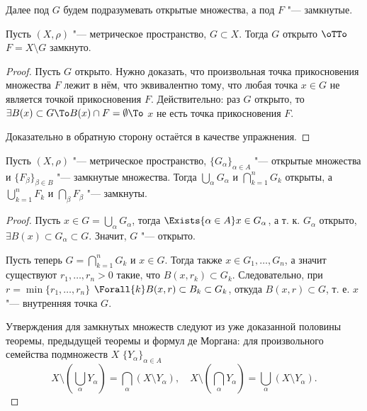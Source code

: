 \documentclass[main]{subfiles}
\begin{document}
Далее под \( G \) будем подразумевать открытые множества,
а под \( F \) "--- замкнутые.

\begin{theorem}
  Пусть \( (X, \rho) \) "--- метрическое пространство,
  \( G \subset X \). Тогда \( G \) открыто \( \oTTo \)
  \( F = X \setminus G \) замкнуто.
\end{theorem}
\begin{proof}
  Пусть \( G \) открыто. Нужно доказать, что
  произвольная точка прикосновения множества \( F \)
  лежит в нём, что эквивалентно тому, что любая точка
  \( x \in G \) не является точкой прикосновения \( F \).
  Действительно: раз \( G \) открыто, то
  \( \exists B(x) \subset G \To B(x) \cap F = \emptyset \To \)
  \( x \) не есть точка прикосновения \( F \).

  Доказательно в обратную сторону остаётся в качестве упражнения.
\end{proof}

\begin{theorem}\label{thm:metric-topolotgy}
  Пусть \( (X, \rho) \) "--- метрическое пространство,
  \( \{ G_\alpha \}_{\alpha \in A} \) "--- открытые множества
  и \( \{ F_\beta \}_{\beta \in B} \) "--- замкнутые множества.
  Тогда \( \bigcup_{\alpha} G_\alpha \) и \( \bigcap_{k = 1}^n G_k \)
  открыты, а \( \bigcup_{k = 1}^n F_k \) и \( \bigcap_{\beta} F_\beta \) "---
  замкнуты.
\end{theorem}
\begin{proof}
  Пусть \( x \in G = \bigcup_{\alpha} G_\alpha \), тогда
  \( \Exists{\alpha \in A} x \in G_\alpha \), а т. к. \( G_\alpha \)
  открыто, \( \exists B(x) \subset G_\alpha \subset G \).
  Значит, \( G \) "--- открыто.

  Пусть теперь \( G = \bigcap_{k = 1}^n G_k \) и \( x \in G \).
  Тогда также \( x \in G_1, \dots, G_n \), а значит
  существуют \( r_1, \dots, r_n > 0 \) такие, что
  \( B(x, r_k) \subset G_k \). Следовательно,
  при \( r = \min\{ r_1, \dots, r_n \} \)
  \( \Forall{k}  B(x, r) \subset B_k \subset G_k \),
  откуда \( B(x, r) \subset G \),
  т. е. \( x \) "--- внутренняя точка \( G \).

  Утверждения для замкнутых множеств следуют из уже доказанной половины
  теоремы, предыдущей теоремы и формул де Моргана:
  для произвольного семейства подмножеств \( X \) \( \{ Y_\alpha \}_{\alpha \in A} \)
  \[
    X \setminus \left( \bigcup_\alpha Y_\alpha \right) =
    \bigcap_\alpha (X \setminus Y_\alpha),
    \quad
    X \setminus \left( \bigcap_\alpha Y_\alpha \right) =
    \bigcup_\alpha (X \setminus Y_\alpha).
  \]
\end{proof}
\end{document}
